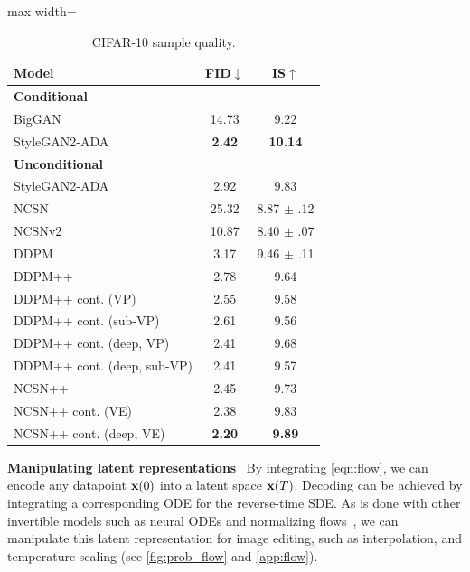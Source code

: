 \begin{table}
\begin{minipage}[t]{0.48\textwidth}
\begin{table}[H]
\centering
\caption{CIFAR-10 sample quality.}\label{tab:fid}\vspace{-1em}
\footnotesize
 \setlength\tabcolsep{3.5pt}
\begin{adjustbox}{max width=\textwidth}
  \begin{tabular}{lcc}
    \toprule
    Model & FID$\downarrow$ & IS$\uparrow$  \\
        \midrule
      {\bf Conditional} & & \\
      \midrule
      BigGAN~\citep{brock2018large} & 14.73 & 9.22 \\
      StyleGAN2-ADA~\citep{karras2020training} & \textbf{2.42} & \textbf{10.14} \\
      \midrule
      {\bf Unconditional} & & \\
      \midrule
      StyleGAN2-ADA~\citep{karras2020training} & 2.92 & 9.83 \\
      NCSN~\citep{song2019generative} & 25.32 & 8.87 $\pm$ .12 \\
      NCSNv2~\citep{song2020improved} & 10.87 & 8.40 $\pm$ .07\\
      DDPM~\citep{ho2020denoising} & 3.17 & 9.46 $\pm$ .11\\
      \midrule
      DDPM++ & 2.78 & 9.64\\
      DDPM++ cont. (VP) & 2.55 & 9.58 \\
      DDPM++ cont. (sub-VP) & 2.61 & 9.56 \\
      DDPM++ cont. (deep, VP) & 2.41 & 9.68\\
      DDPM++ cont. (deep, sub-VP) & 2.41 & 9.57\\
      NCSN++ & 2.45 & 9.73 \\
      NCSN++ cont. (VE) & 2.38 & 9.83\\
      NCSN++ cont. (deep, VE) & \textbf{2.20} & \textbf{9.89}\\
    \bottomrule 
    \end{tabular}
\end{adjustbox}
\end{table}
\end{minipage}
\end{table}

\textbf{Manipulating latent representations}~ By integrating \cref{eqn:flow}, we can encode any datapoint $\mathbf{x}(0)$ into a latent space $\mathbf{x}(T)$. Decoding can be achieved by integrating a corresponding ODE for the reverse-time SDE. As is done with other invertible models such as neural ODEs and normalizing flows~\citep{dinh2016density,kingma2018glow}, we can manipulate this latent representation for image editing, such as interpolation, and temperature scaling (see \cref{fig:prob_flow} and \cref{app:flow}). 

